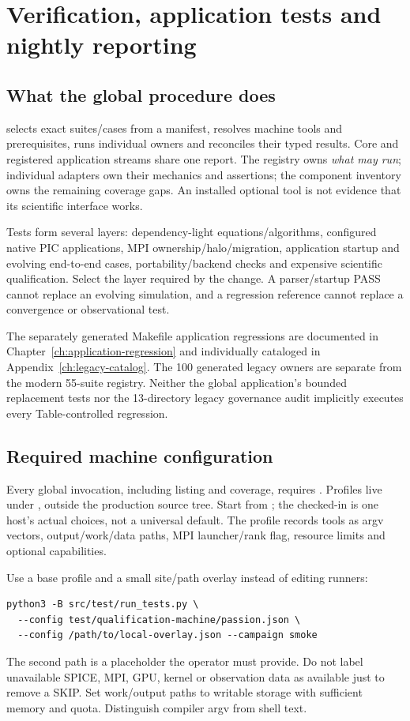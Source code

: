 \chapter{Verification, application tests and nightly reporting}\label{ch:tests}
\section{What the global procedure does}
 selects exact suites/cases from a manifest, resolves
machine tools and prerequisites, runs individual owners and reconciles their
typed results. Core and registered application streams share one report.
The registry owns \emph{what may run}; individual adapters own their mechanics
and assertions; the component inventory owns the remaining coverage gaps.
An installed optional tool is not evidence that its scientific interface works.

Tests form several layers: dependency-light equations/algorithms, configured
native PIC applications, MPI ownership/halo/migration, application startup and
evolving end-to-end cases, portability/backend checks and expensive scientific
qualification. Select the layer required by the change. A parser/startup PASS
cannot replace an evolving simulation, and a regression reference cannot
replace a convergence or observational test.

The separately generated Makefile application regressions are documented in
Chapter~\ref{ch:application-regression} and individually cataloged in
Appendix~\ref{ch:legacy-catalog}. The 100 generated legacy owners are separate
from the modern 55-suite registry. Neither the global application's bounded
replacement tests nor the 13-directory legacy governance audit implicitly
executes every Table-controlled regression.

\section{Required machine configuration}
Every global invocation, including listing and coverage, requires
. Profiles live under , outside
the production source tree. Start from ; the checked-in
 is one host's actual choices, not a universal default.
The profile records tools as argv vectors, output/work/data paths, MPI
launcher/rank flag, resource limits and optional capabilities.

Use a base profile and a small site/path overlay instead of editing runners:
\begin{lstlisting}
python3 -B src/test/run_tests.py \
  --config test/qualification-machine/passion.json \
  --config /path/to/local-overlay.json --campaign smoke
\end{lstlisting}
The second path is a placeholder the operator must provide.
Do not label unavailable SPICE, MPI, GPU, kernel or observation data as
available just to remove a SKIP. Set work/output paths to writable storage
with sufficient memory and quota. Distinguish compiler argv from shell text.

